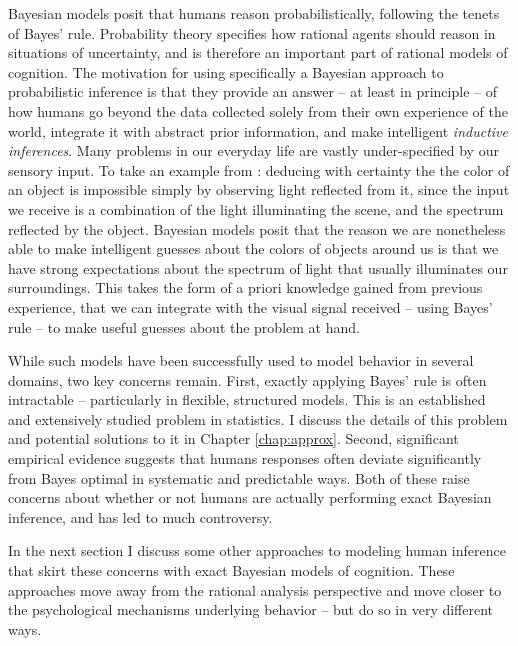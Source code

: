 Bayesian models posit that humans reason probabilistically, following the tenets of Bayes' rule. Probability theory specifies how rational agents should reason in situations of uncertainty\cite{hacking2006emergence, gigerenzer1990empire}, and is therefore an important part of rational models of cognition. The motivation for using specifically a Bayesian approach to probabilistic inference is that they provide an answer -- at least in principle -- of how humans go beyond the data collected solely from their own experience of the world, integrate it with abstract prior information, and make intelligent \textit{inductive inferences}. Many problems in our everyday life are vastly under-specified by our sensory input. To take an example from \citet{griffiths2008bayesian}: deducing with certainty the the color of an object is impossible simply by observing light reflected from it, since the input we receive is a combination of the light illuminating the scene, and the spectrum reflected by the object. Bayesian models posit that the reason we are nonetheless able to make intelligent guesses about the colors of objects around us is that we have strong expectations about the spectrum of light that usually illuminates our surroundings. This takes the form of a priori knowledge gained from previous experience, that we can integrate with the visual signal received -- using Bayes' rule -- to make useful guesses about the problem at hand.

While such models have been successfully used to model behavior in several domains, two key concerns remain. First, exactly applying Bayes' rule is often intractable -- particularly in flexible, structured models. This is an established and extensively studied problem in statistics.\cite{Jaakkola1999, andrieu2003introduction} I discuss the details of this problem and potential solutions to it in Chapter \ref{chap:approx}. Second, significant empirical evidence suggests that humans responses often deviate significantly from Bayes optimal in systematic and predictable ways. \citep{tversky1974judgment, slovic1971comparison, grether1980bayes, fischhoff1983hypothesis} Both of these raise concerns about whether or not humans are actually performing exact Bayesian inference, and has led to much controversy. \citep{mellers2001frequency, gigerenzer1996narrow, samuels2012ending} 

In the next section I discuss some other approaches to modeling human inference that skirt these concerns with exact Bayesian models of cognition. These approaches move away from the rational analysis perspective and move closer to the psychological mechanisms underlying behavior\citep{griffiths2012bridging} -- but do so in very different ways.

